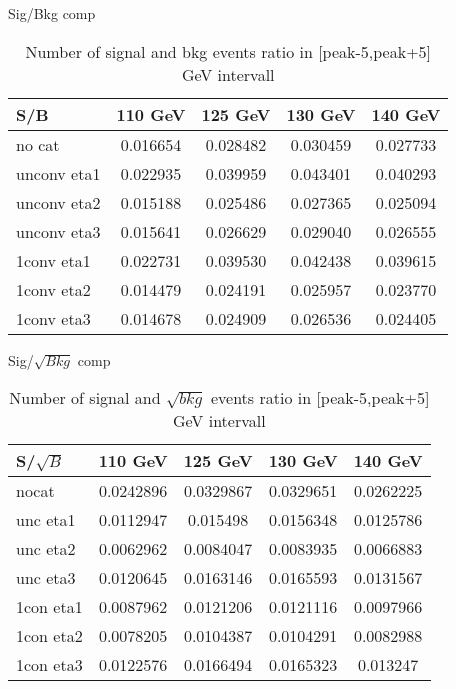 \documentclass[10pt,UKenglish, leqno, xcolor = dvipsnames]{beamer}
\begin{document}
	\begin{frame}{Sig/Bkg comp}
		\vfill
		\centering
		\begin{table}[tbp]
			\centering
			\begin{tabular}{lcccc}
				\toprule[1.5pt]
				S/B			& 110 GeV	& 125 GeV	& 130 GeV	& 140 GeV	\\
				\midrule
				no cat 		& 0.016654	& 0.028482	& 0.030459	& 0.027733	\\
				unconv eta1 & 0.022935	& 0.039959	& 0.043401	& 0.040293	\\
				unconv eta2 & 0.015188	& 0.025486	& 0.027365	& 0.025094	\\
				unconv eta3 & 0.015641	& 0.026629	& 0.029040	& 0.026555	\\
				1conv eta1 	& 0.022731	& 0.039530	& 0.042438	& 0.039615	\\
				1conv eta2 	& 0.014479	& 0.024191	& 0.025957	& 0.023770	\\
				1conv eta3	& 0.014678	& 0.024909	& 0.026536	& 0.024405	\\
				\bottomrule[1.5pt]
			\end{tabular}
			\caption{Number of signal and bkg events ratio in [peak-5,peak+5] GeV intervall}
		\end{table}
		\vfill
	\end{frame}

	\begin{frame}{Sig/$\sqrt{Bkg}$ comp}
		\vfill
		\begin{table}[tbp]
			\centering
			\begin{tabular}{lcccc}
				\toprule[1.5pt]
				S/$\sqrt{B}$& 110 GeV	& 125 GeV	& 130 GeV	& 140 GeV	\\
				\midrule
				nocat		& 0.0242896	& 0.0329867 & 0.0329651 & 0.0262225 \\
				unc eta1	& 0.0112947	& 0.015498	& 0.0156348	& 0.0125786	\\
				unc eta2	& 0.0062962	& 0.0084047	& 0.0083935	& 0.0066883 \\
				unc eta3	& 0.0120645	& 0.0163146	& 0.0165593	& 0.0131567	\\
				1con eta1	& 0.0087962	& 0.0121206	& 0.0121116	& 0.0097966	\\
				1con eta2	& 0.0078205	& 0.0104387	& 0.0104291	& 0.0082988	\\
				1con eta3	& 0.0122576	& 0.0166494	& 0.0165323	& 0.013247	\\
				
				\bottomrule[1.5pt]
			\end{tabular}
			\caption{Number of signal and $\sqrt{bkg}$ events ratio in [peak-5,peak+5] GeV intervall}
		\end{table}
		\vfill
	\end{frame}
	
\end{document}

